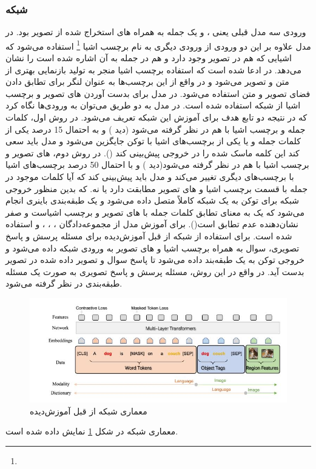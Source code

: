 \subsubsection{   شبکه }
	ورودی سه مدل قبلی یعنی 
	،
	و 
	یک جمله به همراه 
	های استخراج شده از تصویر بود. در مدل 
	علاوه بر این دو ورودی از ورودی دیگری به نام برچسب اشیا
	\footnote{}
	استفاده می‌شود که اشیایی که هم در تصویر وجود دارد و هم در جمله به آن اشاره شده است را نشان می‌دهد. در 
	\cite{li2020oscar}
ادعا شده است که استفاده برچسب اشیا منجر به تولید بازنمایی بهتری از متن و تصویر می‌شود و در واقع از این برچسب‌ها به عنوان لنگر برای تطابق دادن فضای تصویر و متن استفاده می‌شود. در مدل
	برای بدست آوردن 
	های تصویر و برچسب اشیا از شبکه 
	استفاده شده است. در مدل 
	به دو طریق می‌توان به ورود‌ی‌ها نگاه کرد که در نتیجه دو تابع هدف برای آموزش این شبکه تعریف می‌شود. در روش اول، کلمات جمله و برچسب اشیا با هم در نظر گرفته می‌شود (دید ) و به احتمال 15 درصد یکی از کلمات جمله و یا یکی از برچسب‌های اشیا با توکن 
	\lr{[MASK]}
	جایگزین می‌شود و مدل باید سعی کند این کلمه ماسک شده را در خروجی پیش‌بینی کند
	().
	در روش دوم،
	های تصویر و برچسب اشیا با هم در نظر گرفته می‌شود(دید ) و با احتمال 50 درصد برچسب‌های اشیا با برچسب‌های دیگری تغییر می‌کند و مدل باید پیش‌بینی کند که آیا کلمات موجود در جمله با قسمت برچسب اشیا و 
	های تصویر مطابقت دارد یا نه. که بدین منظور خروجی شبکه برای توکن
	\lr{[CLS]}
	به یک شبکه کاملاً متصل داده می‌شود و یک طبقه‌بندی باینری انجام می‌شود که یک به معنای تطابق کلمات جمله با 
	های تصویر و برچسب اشیاست و صفر نشان‌دهنده عدم تطابق است().  برای آموزش مدل 
	از مجموعه‌دادگان
	،
	،
	،
	و
	استفاده شده است. برای استفاده از شبکه از قبل آموزش‌دیده
	برای مسئله پرسش و پاسخ تصویری، سوال به همراه برچسب اشیا و 
	های تصویر به ورودی شبکه داده ‌می‌شود و خروجی توکن
	\lr{[CLS]}
	به یک طبقه‌بند داده ‌می‌شود تا پاسخ سوال و تصویر داده شده در تصویر بدست آید. در واقع در این روش، مسئله پرسش و پاسخ تصویری به صورت یک مسئله طبقه‌بندی در نظر گرفته ‌می‌شود.
	\begin{figure}
		\centerline{\includegraphics[scale=0.7]{images/OSCAR.JPG}}
		\caption[معماری شبکه از قبل آموزش‌دیده]{معماری شبکه از قبل آموزش‌دیده\cite{li2020oscar}}
		\label{fig:OSCAR}
	\end{figure}
	معماری شبکه 
	در شکل 
	\ref{fig:OSCAR}
	نمایش داده شده است.
	
